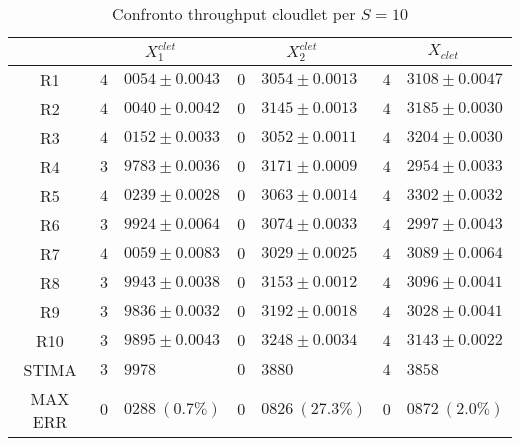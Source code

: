 \begin{table}[!h]
\begin{tabular}{c|r@{.}l|r@{.}l|r@{.}l}
& \multicolumn{2}{|c|}{$X_1^{clet}$}
& \multicolumn{2}{|c|}{$X_2^{clet}$}
& \multicolumn{2}{|c}{$X_{clet}$} 
\\          
\hline
R1      & $4$&$0054 \pm 0.0043$ & $0$&$3054 \pm 0.0013$ & $4$&$3108 \pm 0.0047$ \\
R2      & $4$&$0040 \pm 0.0042$ & $0$&$3145 \pm 0.0013$ & $4$&$3185 \pm 0.0030$ \\
R3      & $4$&$0152 \pm 0.0033$ & $0$&$3052 \pm 0.0011$ & $4$&$3204 \pm 0.0030$ \\
R4      & $3$&$9783 \pm 0.0036$ & $0$&$3171 \pm 0.0009$ & $4$&$2954 \pm 0.0033$ \\
R5      & $4$&$0239 \pm 0.0028$ & $0$&$3063 \pm 0.0014$ & $4$&$3302 \pm 0.0032$ \\
R6      & $3$&$9924 \pm 0.0064$ & $0$&$3074 \pm 0.0033$ & $4$&$2997 \pm 0.0043$ \\
R7      & $4$&$0059 \pm 0.0083$ & $0$&$3029 \pm 0.0025$ & $4$&$3089 \pm 0.0064$ \\
R8      & $3$&$9943 \pm 0.0038$ & $0$&$3153 \pm 0.0012$ & $4$&$3096 \pm 0.0041$ \\
R9      & $3$&$9836 \pm 0.0032$ & $0$&$3192 \pm 0.0018$ & $4$&$3028 \pm 0.0041$ \\
R10     & $3$&$9895 \pm 0.0043$ & $0$&$3248 \pm 0.0034$ & $4$&$3143 \pm 0.0022$ \\
STIMA   & $3$&$9978$            & $0$&$3880$            & $4$&$3858$            \\
MAX ERR & $0$&$0288 \ (0.7\%)$  & $0$&$0826 \ (27.3\%)$ & $0$&$0872 \ (2.0\%)$    
\end{tabular}
\centering
\caption{Confronto throughput cloudlet per $S=10$}
\label{tab:10_xclet}
\end{table}
